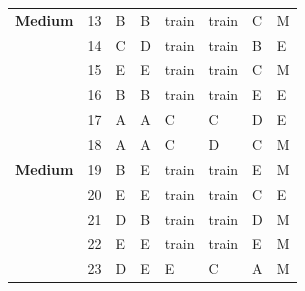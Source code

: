 \documentclass[pageno]{final_paper}
\begin{document}
\begin{table}[]
\begin{tabular}{llllllll}
\textbf{Medium}          & 13              & B                       & B                      & train                   & train                   & C                       & M                   \\
\textbf{}                & 14              & C                       & D                      & train                   & train                   & B                       & E                   \\
\textbf{}                & 15              & E                       & E                      & train                   & train                   & C                       & M                   \\
\textbf{}                & 16              & B                       & B                      & train                   & train                   & E                       & E                   \\
\textbf{}                & 17              & A                       & A                      & C                       & C                       & D                       & E                   \\
\textbf{}                & 18              & A                       & A                      & C                       & D                       & C                       & M                   \\
\textbf{Medium}          & 19              & B                       & E                      & train                   & train                   & E                       & M                   \\
\textbf{}                & 20              & E                       & E                      & train                   & train                   & C                       & E                   \\
\textbf{}                & 21              & D                       & B                      & train                   & train                   & D                       & M                   \\
\textbf{}                & 22              & E                       & E                      & train                   & train                   & E                       & M                   \\
\textbf{}                & 23              & D                       & E                      & E                       & C                       & A                       & M                   \\

\end{tabular}
\end{table}
\end{document}
